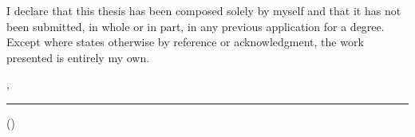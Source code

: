\thispagestyle{empty}
\vspace*{0.65\textheight}
\noindent
I declare that this thesis has been composed solely by myself and that it has not been submitted, in whole or in part, in any previous application for a degree. Except where states otherwise by reference or acknowledgment, the work presented is entirely my own.

\vspace{12mm}
\noindent
\getSubmissionLocation{}, \getSubmissionDate{} 

\vspace{10mm}
\noindent
\rule{6cm}{0.4pt}

\noindent
(\getAuthor{})

\cleardoublepage{}
